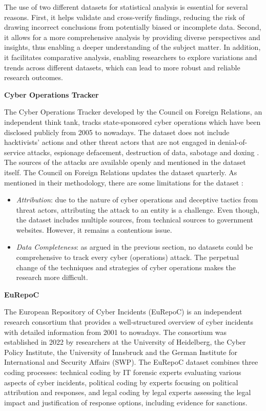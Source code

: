 The use of two different datasets for statistical analysis is essential for several reasons. First, it helps validate and cross-verify findings, reducing the risk of drawing incorrect conclusions from potentially biased or incomplete data. Second, it allows for a more comprehensive analysis by providing diverse perspectives and insights, thus enabling a deeper understanding of the subject matter. In addition, it facilitates comparative analysis, enabling researchers to explore variations and trends across different datasets, which can lead to more robust and reliable research outcomes.

\textbf{Cyber Operations Tracker}

The Cyber Operations Tracker developed by the Council on Foreign Relations, an independent think tank, tracks state-sponsored cyber operations which have been disclosed publicly from 2005 to nowadays. The dataset does not include hacktivists' actions and other threat actors that are not engaged in denial-of-service attacks, espionage defacement, destruction of data, sabotage and doxing \autocite{councilonforeignrelations_2023_tracking}. The sources of the attacks are available openly and mentioned in the dataset itself. The Council on Foreign Relations updates the dataset quarterly. As mentioned in their methodology, there are some limitations for the dataset \autocite{councilonforeignrelations_2023_tracking}:

\begin{itemize}
    \item \textit{Attribution}: due to the nature of cyber operations and deceptive tactics from threat actors, attributing the attack to an entity is a challenge. Even though, the dataset includes multiple sources, from technical sources to government websites. However, it remains a contentious issue.
    \item \textit{Data Completeness}: as argued in the previous section, no datasets could be comprehensive to track every cyber (operations) attack. The perpetual change of the techniques and strategies of cyber operations makes the research more difficult.
\end{itemize}

\textbf{EuRepoC}

The European Repository of Cyber Incidents (EuRepoC) is an independent research consortium that provides a well-structured overview of cyber incidents with detailed information from 2001 to nowadays. The consortium was established in 2022 by researchers at the University of Heidelberg, the Cyber Policy Institute, the University of Innsbruck and the German Institute for International and Security Affairs (SWP). The EuRepoC dataset combines three coding processes: technical coding by IT forensic experts evaluating various aspects of cyber incidents, political coding by experts focusing on political attribution and responses, and legal coding by legal experts assessing the legal impact and justification of response options, including evidence for sanctions. 

